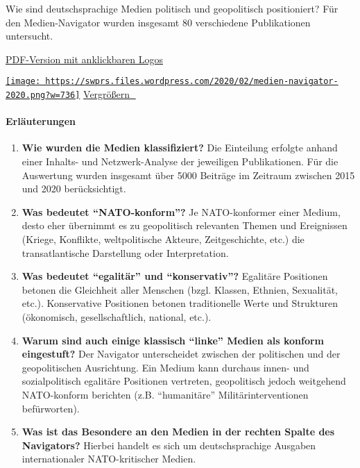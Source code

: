 Wie sind deutschsprachige Medien politisch und geopolitisch
positioniert? Für den Medien-Navi­gator wurden insgesamt 80 verschiedene
Publikationen untersucht.

\href{https://swprs.files.wordpress.com/2020/02/medien-navigator-2020.pdf}{PDF-Version
mit anklickbaren Logos}

\href{https://swprs.files.wordpress.com/2020/02/medien-navigator-2020.png}{\texttt{[image: https://swprs.files.wordpress.com/2020/02/medien-navigator-2020.png?w=736]}}
\href{https://swprs.files.wordpress.com/2020/02/medien-navigator-2020.png}{Vergrößern
🔎}

\hypertarget{erluxe4uterungen}{%
\paragraph{Erläuterungen}\label{erluxe4uterungen}}

\begin{enumerate}
\def\labelenumi{\arabic{enumi}.}
\tightlist
\item
  \textbf{Wie wurden die Medien klassifiziert?} Die Einteilung erfolgte
  anhand einer Inhalts- und Netzwerk-Analyse der jeweiligen
  Publikationen. Für die Auswertung wurden insgesamt über 5000 Beiträge
  im Zeitraum zwischen 2015 und 2020 berücksichtigt.
\item
  \textbf{Was bedeutet ``NATO-konform''?} Je NATO-konformer einer
  Medium, desto eher übernimmt es zu geopolitisch relevanten Themen und
  Ereignissen (Kriege, Konflikte, weltpolitische Akteure,
  Zeitgeschichte, etc.) die transatlantische Darstellung oder
  Interpretation.
\item
  \textbf{Was bedeutet ``egalitär'' und ``konservativ''?} Egalitäre
  Positionen betonen die Gleichheit aller Menschen (bzgl. Klassen,
  Ethnien, Sexualität, etc.). Konservative Positionen betonen
  traditionelle Werte und Strukturen (ökonomisch, gesellschaftlich,
  national, etc.).
\item
  \textbf{Warum sind auch einige klassisch ``linke'' Medien als konform
  eingestuft?} Der Navigator unterscheidet zwischen der politischen und
  der geopolitischen Ausrichtung. Ein Medium kann durchaus innen- und
  sozialpolitisch egalitäre Positionen vertreten, geopolitisch jedoch
  weitgehend NATO-konform berichten (z.B. ``humanitäre''
  Militärinterventionen befürworten).
\item
  \textbf{Was ist das Besondere an den Medien in der rechten Spalte des
  Navigators?} Hierbei handelt es sich um deutschsprachige Ausgaben
  internationaler NATO-kritischer Medien.
\end{enumerate}

